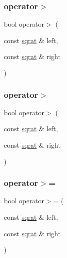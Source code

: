 \mbox{\label{classsqrat_a0a9ebc0afb8356e073d69a69d1450a65}} 
\subsubsection{\texorpdfstring{operator$>$}{operator>}\hspace{0.1cm}{\footnotesize\ttfamily [1/2]}}
{\footnotesize\ttfamily bool operator$>$ (\begin{DoxyParamCaption}\item[{const \mbox{\hyperlink{classsqrat}{sqrat}} \&}]{left,  }\item[{const \mbox{\hyperlink{classsqrat}{sqrat}} \&}]{right }\end{DoxyParamCaption})\hspace{0.3cm}{\ttfamily [friend]}}

\mbox{\label{classsqrat_a0a9ebc0afb8356e073d69a69d1450a65}} 
\subsubsection{\texorpdfstring{operator$>$}{operator>}\hspace{0.1cm}{\footnotesize\ttfamily [2/2]}}
{\footnotesize\ttfamily bool operator$>$ (\begin{DoxyParamCaption}\item[{const \mbox{\hyperlink{classsqrat}{sqrat}} \&}]{left,  }\item[{const \mbox{\hyperlink{classsqrat}{sqrat}} \&}]{right }\end{DoxyParamCaption})\hspace{0.3cm}{\ttfamily [friend]}}

\mbox{\label{classsqrat_adac0450048dc40c698aa22f334e280a1}} 
\subsubsection{\texorpdfstring{operator$>$=}{operator>=}\hspace{0.1cm}{\footnotesize\ttfamily [1/2]}}
{\footnotesize\ttfamily bool operator$>$= (\begin{DoxyParamCaption}\item[{const \mbox{\hyperlink{classsqrat}{sqrat}} \&}]{left,  }\item[{const \mbox{\hyperlink{classsqrat}{sqrat}} \&}]{right }\end{DoxyParamCaption})\hspace{0.3cm}{\ttfamily [friend]}}

